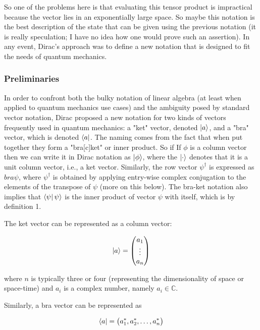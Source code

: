 \documentclass[11pt, oneside]{article}   	%
\begin{document}
\bigskip
\noindent
So one of the problems here is that evaluating this tensor product is impractical because the vector lies in an exponentially large space. So maybe this notation is the best description 
of the state that can be given using the previous notation (it is really speculation; I have no idea how one would prove such an assertion). In any event, Dirac's approach was to 
define a new notation that is designed to fit the needs of quantum mechanics. 

\subsubsection{Preliminaries}
In order to confront both the bulky notation of linear algebra (at least when applied to quantum mechanics use cases) and the ambiguity posed by standard vector notation, 
Dirac proposed a new notation for two kinds of vectors frequently used in quantum mechanics:  a "ket" vector, denoted 
$\ket{a}$, and a "bra" vector, which is denoted $\bra{a}$. The naming comes from the fact that when put together they form a "bra[c]ket" or inner product.  So if If $\phi$ is a column vector 
then we can write it in Dirac notation as $\ket{\phi}$, where the $\ket{\cdot}$ denotes that it is a unit column vector, i.e., a ket vector. Similarly, the row vector 
$\psi^\dagger$  is expressed as $bra{\psi}$, where $\psi^\dagger$  is obtained by applying entry-wise complex conjugation to the elements of the transpose of $\psi$ (more on this below). 
The bra-ket notation also implies that $\bra{\psi} \psi \rangle$  is the inner product of vector $\psi$ with itself, which is by definition 1.

\bigskip
\noindent
The ket vector can be represented as a column vector:

\begin{equation*}
\ket{a} = 
\begin{pmatrix}
a_1\\
\vdots \\
a_n
\end{pmatrix}
\end{equation*}

\noindent
where $n$ is typically three or four (representing the dimensionality of space or space-time) and $a_i$ is a complex number, namely $a_i \in \mathbb{C}$.

\bigskip
\noindent
Similarly, a bra vector can be represented as


\begin{equation*}
\bra{a} = \big (a^*_1, a^*_2, \hdots, a^*_n \big )
\end{equation*}
\end{document}

